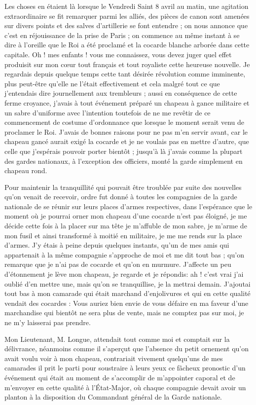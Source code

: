 \documentclass[11pt,a4paper]{report}
\begin{document}
Les choses en étaient là lorsque le Vendredi Saint 8 avril au matin, une agitation extraordinaire se fit remarquer parmi les alliés, des pièces de canon sont amenées sur divers points et des salves d'artillerie se font entendre ; on nous annonce que c'est en réjouissance de la prise de Paris ; on commence au même instant à se dire à l'oreille que le Roi a été proclamé et la cocarde blanche arborée dans cette capitale. Oh ! mes enfants ! vous me connaissez, vous devez juger quel effet produisit sur mon cœur tout français et tout royaliste cette heureuse nouvelle. Je regardais depuis quelque temps cette tant désirée révolution comme imminente, plus peut-être qu'elle ne l'était effectivement et cela malgré tout ce que j'entendais dire journellement aux trembleurs ; aussi en conséquence de cette ferme croyance, j'avais à tout événement préparé un chapeau à gance militaire et un sabre d'uniforme avec l'intention toutefois de ne me revêtir de ce commencement de costume d'ordonnance que lorsque le moment serait venu de proclamer le Roi. J'avais de bonnes raisons pour ne pas m'en servir avant, car le chapeau gancé aurait exigé la cocarde et je ne voulais pas en mettre d'autre, que celle que j'espérais pouvoir porter bientôt ; jusqu'à là j'avais comme la plupart des gardes nationaux, à l'exception des officiers, monté la garde simplement en chapeau rond.

Pour maintenir la tranquillité qui pouvait être troublée par suite des nouvelles qu'on venait de recevoir, ordre fut donné à toutes les compagnies de la garde nationale de se réunir sur leurs places d'armes respectives, dans l'espérance que le moment où je pourrai orner mon chapeau d'une cocarde n'est pas éloigné, je me décide cette fois à la placer sur ma tête je m'affuble de mon sabre, je m'arme de mon fusil et ainsi transformé à moitié en militaire, je me me rends sur la place d'armes. J'y étais à peine depuis quelques instants, qu'un de mes amis qui appartenait à la même compagnie s'approche de moi et me dit tout bas ; qu'on remarque que je n'ai pas de cocarde et qu'on en murmure. J'affecte un peu d'étonnement je lève mon chapeau, je regarde et je répondis: ah ! c'est vrai j'ai oublié d'en mettre une, mais qu'on se tranquillise, je la mettrai demain. J'ajoutai tout bas à mon camarade qui était marchand d'enjolivures et qui en cette qualité vendait des cocardes : Vous auriez bien envie de vous défaire en ma faveur d'une marchandise qui bientôt ne sera plus de vente, mais ne comptez pas sur moi, je ne m'y laisserai pas prendre.

Mon Lieutenant, M. Longue, attendait tout comme moi et comptait sur la délivrance, néanmoins comme il s'aperçut que l'absence du petit ornement qu'on avait voulu voir à mon chapeau, contrariait vivement quelqu'uns de mes camarades il prit le parti pour soustraire à leurs yeux ce fâcheux pronostic d'un événement qui était au moment de s'accomplir de m'appointer caporal et de m'envoyer en cette qualité à l'État-Major, où chaque compagnie devait avoir un planton à la disposition du Commandant général de la Garde nationale.
\end{document}
